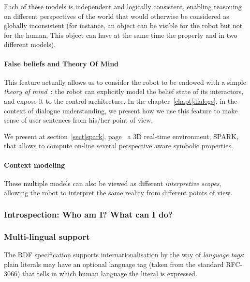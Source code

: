 Each of these models is independent and logically consistent, enabling
reasoning on different perspectives of the world that would otherwise be
considered as globally inconsistent (for instance, an object can be visible for
the robot but not for the human. This object can have at the same time the
property  and  in two different models).

\paragraph{False beliefs and Theory Of Mind} \label{sect|theory-of-mind}

This feature actually allows us to consider the robot to be endowed with a
simple \emph{theory of mind}~\cite{Scassellati2002}: the robot can explicitly
model the belief state of its interactors, and expose it to the control
architecture. In the chapter~\ref{chapt|dialogs},  in the context of dialogue
understanding, we present how we use this feature to make sense of user
sentences from his/her point of view.

We present at section~\ref{sect|spark}, page~\pageref{sect|spark} a 3D
real-time environment, SPARK, that allows to compute on-line several
perspective aware symbolic properties.

\paragraph{Context modeling}

These multiple models can also be viewed as different \emph{interpretive
scopes}, allowing the robot to interpret the same reality from different points
of view.



\subsubsection{Introspection: Who am I? What can I do?}

\subsubsection{Multi-lingual support}
\label{sect|multilingual}

The RDF specification supports internationalisation by the way of
\emph{language tags}: plain literals may have an optional language tag (taken
from the standard RFC-3066) that tells in which human language the literal is
expressed.


